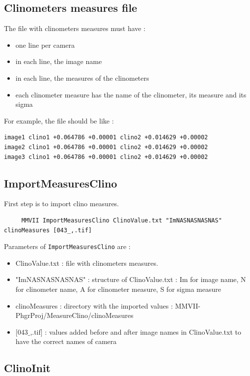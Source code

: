 \subsection{Clinometers measures file}

The file with clinometers measures must have :
\begin{itemize}
     \item one line per camera
     \item in each line, the image name
     \item in each line, the measures of the clinometers
     \item each clinometer measure has the name of the clinometer, its measure and its sigma  
\end{itemize}

For example, the file should be like :

\begin{lstlisting}
image1 clino1 +0.064786 +0.00001 clino2 +0.014629 +0.00002
image2 clino1 +0.064786 +0.00001 clino2 +0.014629 +0.00002
image3 clino1 +0.064786 +0.00001 clino2 +0.014629 +0.00002
\end{lstlisting}


\subsection{ImportMeasuresClino}

First step is to import clino measures.

\begin{lstlisting}
     MMVII ImportMeasuresClino ClinoValue.txt "ImNASNASNASNAS" clinoMeasures [043_,.tif]
\end{lstlisting}

Parameters of {\tt ImportMeasuresClino} are :
\begin{itemize}
     \item ClinoValue.txt : file with clinometers measures.
     \item "ImNASNASNASNAS" : structure of ClinoValue.txt : Im for image name, N for clinometer name, A for clinometer measure, S for sigma measure
     \item clinoMeasures : directory with the imported values : MMVII-PhgrProj/MeasureClino/clinoMeasures
     \item $[$043$\_$,.tif$]$ : values added before and after image names in ClinoValue.txt to have the correct names of camera
\end{itemize}


\subsection{ClinoInit}

